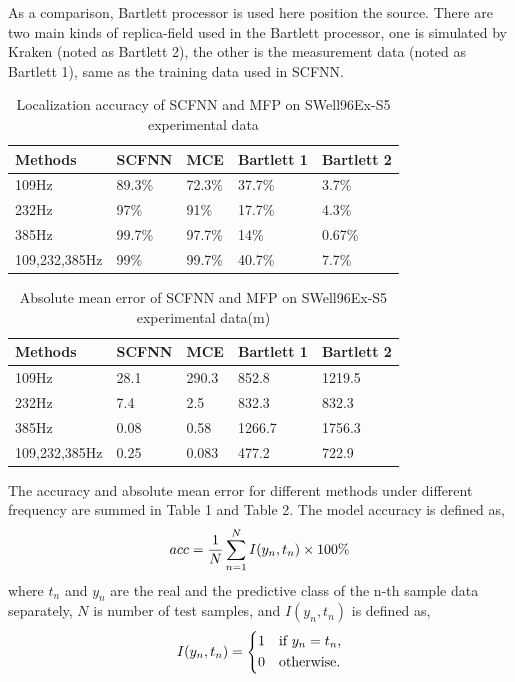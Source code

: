 As a comparison, Bartlett processor is used here position the source.
There are two main kinds of replica-field used in the Bartlett processor, one is simulated by Kraken (noted as Bartlett 2), the other is the measurement data (noted as Bartlett 1), same as the training data used in SCFNN.
\begin{table}[]
\caption{Localization accuracy of SCFNN and MFP on SWell96Ex-S5 experimental data}
\label{my-label}
\begin{tabular}{@{}lllll@{}}
\toprule
Methods       & SCFNN    & MCE    & Bartlett 1 & Bartlett 2 \\ \midrule
109Hz         & 89.3\% & 72.3\% & 37.7\%     & 3.7\%      \\
232Hz         & 97\%   & 91\%   & 17.7\%     & 4.3\%      \\
385Hz         & 99.7\% & 97.7\% & 14\%       & 0.67\%     \\
109,232,385Hz & 99\%   & 99.7\% & 40.7\%     & 7.7\%      \\ \bottomrule
\end{tabular}
\end{table}
\begin{table}[]
\caption{Absolute mean error of SCFNN and MFP on SWell96Ex-S5 experimental data(m)}
\label{my-label}
\begin{tabular}{@{}lllll@{}}
\toprule
Methods       & SCFNN  & MCE   & Bartlett 1 & Bartlett 2 \\ \midrule
109Hz         & 28.1 & 290.3 & 852.8      & 1219.5     \\
232Hz         & 7.4  & 2.5   & 832.3      & 832.3      \\
385Hz         & 0.08 & 0.58  & 1266.7     & 1756.3     \\
109,232,385Hz & 0.25 & 0.083 & 477.2      & 722.9      \\ \bottomrule
\end{tabular}
\end{table}
The accuracy and absolute mean error for different methods under different frequency are summed in Table 1 and Table 2.
The model accuracy is defined as,
\begin{equation}
acc = {{\rm{1}} \over N}\sum\limits_{n = 1}^N {I({y_n},{t_n})}  \times 100\%
\end{equation}
where $t_{n}$ and $y_{n}$ are the real and the predictive class of the n-th sample data separately, $N$ is number of test samples, and ${I({y_n},{t_n})}$ is defined as,
\begin{equation}
  I({y_n},{t_n}) = \left\{
  \begin{aligned}
  1 &\text{\quad if\ } {y_n} = {t_n}, \\
  0 &\text{\quad otherwise.}
  \end{aligned}
  \right.
\end{equation}

